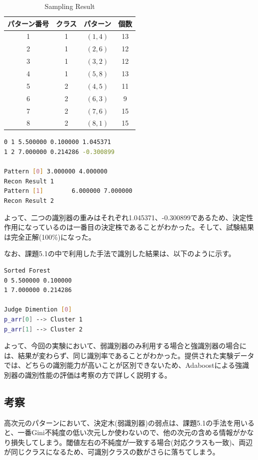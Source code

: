 \documentclass[ %
  uplatex,%
  papersize%
]{jsarticle}
\begin{document}
\begin{table}[h]\footnotesize
\caption{Sampling Result}
\label{}
\centering
\begin{tabular}{|c|c|c|c|}
\hline
パターン番号&クラス&パターン&個数\\
\hline
1 & 1 &$(1, 4)$ &13\\
\hline
2 & 1 &$(2, 6)$ &12\\
\hline
3 & 1 &$(3, 2)$ &12\\
\hline
4 & 1 &$(5, 8)$ &13\\
\hline
5 & 2 &$(4, 5)$ &11\\
\hline
6 & 2 &$(6, 3)$ &9\\
\hline
7 & 2 &$(7, 6)$ &15\\
\hline
8 & 2 &$(8, 1)$ &15\\
\hline
\end{tabular} 
\end{table}

\begin{lstlisting}[language=bash,caption=Adaboost and Recognition]
0 1 5.500000 0.100000 1.045371
1 2 7.000000 0.214286 -0.300899

Pattern [0]	3.000000 4.000000
Recon Result 1
Pattern [1]	       6.000000 7.000000
Recon Result 2
\end{lstlisting}

よって、二つの識別器の重みはそれぞれ1.045371、-0.300899であるため、決定性作用になっているのは一番目の決定株であることがわかった。そして、試験結果は完全正解(100\%)になった。

なお、課題5.1の中で利用した手法で識別した結果は、以下のように示す。

\begin{lstlisting}[language=bash,caption=Decetion Stump Result]
Sorted Forest
0 5.500000 0.100000
1 7.000000 0.214286

Judge Dimention [0]
p_arr[0] --> Cluster 1 
p_arr[1] --> Cluster 2 
\end{lstlisting}

よって、今回の実験において、弱識別器のみ利用する場合と強識別器の場合には、結果が変わらず、同じ識別率であることがわかった。提供された実験データでは、どちらの識別能力が高いことが区別できないため、Adaboostによる強識別器の識別性能の評価は考察の方で詳しく説明する。
\subsection{考察}
高次元のパターンにおいて、決定木(弱識別器)の弱点は、課題5.1の手法を用いると、一番Gini不純度の低い次元しか使わないので、他の次元の含める情報がかなり損失してしまう。閾値左右の不純度が一致する場合(対応クラスも一致)、両辺が同じクラスになるため、可識別クラスの数がさらに落ちてしまう。
\end{document}
